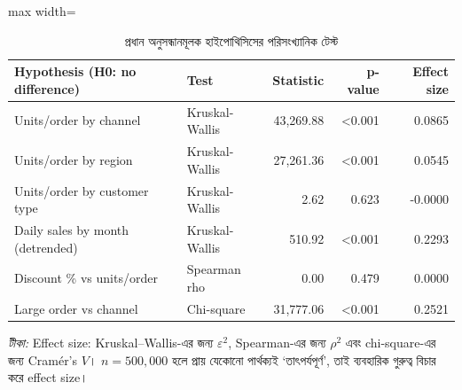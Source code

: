 \begin{table}[htbp]
\centering
\small
\caption{প্রধান অনুসন্ধানমূলক হাইপোথিসিসের পরিসংখ্যানিক টেস্ট}
\label{tab:tests}
\begin{adjustbox}{max width=\linewidth}
\begin{tabular}{llrrr}
\toprule
\textbf{Hypothesis (H0: no difference)} & \textbf{Test} & \textbf{Statistic} & \textbf{p-value} & \textbf{Effect size} \\
\midrule
Units/order by channel & Kruskal-Wallis & 43,269.88 & <0.001 & 0.0865 \\
Units/order by region & Kruskal-Wallis & 27,261.36 & <0.001 & 0.0545 \\
Units/order by customer type & Kruskal-Wallis & 2.62 & 0.623 & -0.0000 \\
Daily sales by month (detrended) & Kruskal-Wallis & 510.92 & <0.001 & 0.2293 \\
Discount \% vs units/order & Spearman rho & 0.00 & 0.479 & 0.0000 \\
Large order vs channel & Chi-square & 31,777.06 & <0.001 & 0.2521 \\
\bottomrule
\end{tabular}
\end{adjustbox}
\par\smallskip\parbox{0.92\linewidth}{\footnotesize\emph{টীকা:} Effect size: Kruskal--Wallis-এর জন্য $\varepsilon^2$, Spearman-এর জন্য $\rho^2$ এবং chi-square-এর জন্য Cram\'er's $V$। $n=500{,}000$ হলে প্রায় যেকোনো পার্থক্যই `তাৎপর্যপূর্ণ', তাই ব্যবহারিক গুরুত্ব বিচার করে effect size।}
\end{table}